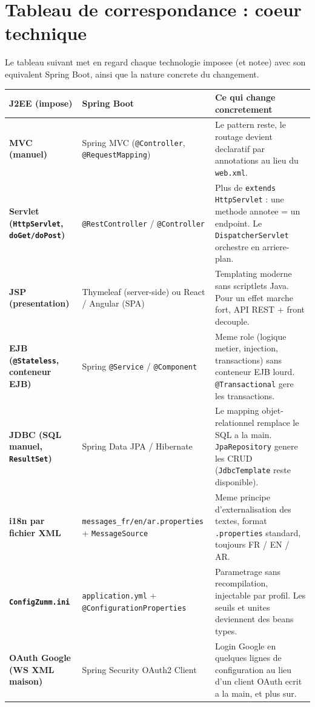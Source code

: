 \section{Tableau de correspondance : coeur technique}
Le tableau suivant met en regard chaque technologie imposee (et notee) avec son
equivalent Spring Boot, ainsi que la nature concrete du changement.

\begin{xltabular}{\textwidth}{>{\bfseries}p{3cm} p{3.4cm} X}
\toprule
\textbf{J2EE (impose)} & \textbf{Spring Boot} & \textbf{Ce qui change concretement} \\
\midrule
\endhead
MVC (manuel) & Spring MVC (\texttt{@Controller}, \texttt{@RequestMapping}) & Le pattern reste, le routage devient declaratif par annotations au lieu du \texttt{web.xml}. \\
Servlet (\texttt{HttpServlet}, \texttt{doGet/doPost}) & \texttt{@RestController} / \texttt{@Controller} & Plus de \texttt{extends HttpServlet} : une methode annotee = un endpoint. Le \texttt{DispatcherServlet} orchestre en arriere-plan. \\
JSP (presentation) & Thymeleaf (server-side) ou React / Angular (SPA) & Templating moderne sans scriptlets Java. Pour un effet marche fort, API REST + front decouple. \\
EJB (\texttt{@Stateless}, conteneur EJB) & Spring \texttt{@Service} / \texttt{@Component} & Meme role (logique metier, injection, transactions) sans conteneur EJB lourd. \texttt{@Transactional} gere les transactions. \\
JDBC (SQL manuel, \texttt{ResultSet}) & Spring Data JPA / Hibernate & Le mapping objet-relationnel remplace le SQL a la main. \texttt{JpaRepository} genere les CRUD (\texttt{JdbcTemplate} reste disponible). \\
i18n par fichier XML & \texttt{messages\_fr/en/ar.properties} + \texttt{MessageSource} & Meme principe d'externalisation des textes, format \texttt{.properties} standard, toujours FR / EN / AR. \\
\texttt{ConfigZumm.ini} & \texttt{application.yml} + \texttt{@ConfigurationProperties} & Parametrage sans recompilation, injectable par profil. Les seuils et unites deviennent des beans types. \\
OAuth Google (WS XML maison) & Spring Security OAuth2 Client & Login Google en quelques lignes de configuration au lieu d'un client OAuth ecrit a la main, et plus sur. \\

\end{xltabular}
